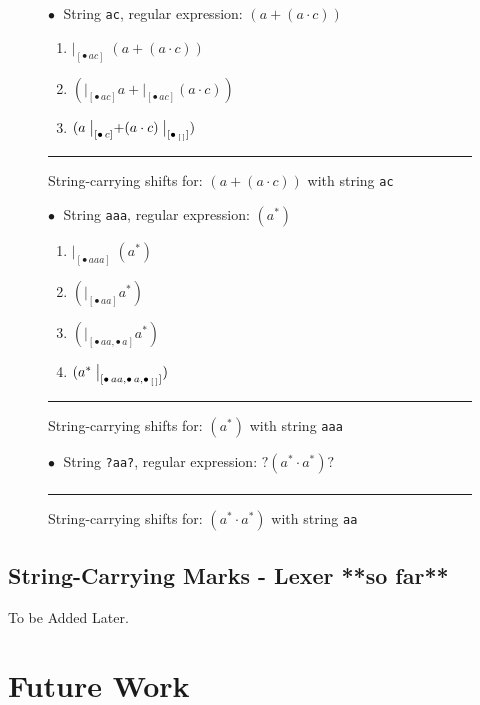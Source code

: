 \documentclass[12pt]{article}
\newcommand{\Marked}[1]{\bullet\,#1}
\newcommand{\emptylist}{[\,]}
\begin{document}
\begin{figure}[ht]
  $\bullet\;$ String \texttt{ac}, regular expression: $(a + (a \cdot c))$
\begin{enumerate}
  \item $\bigl|_{[\Marked{ac}]} \;( a + (a \cdot c) )$
  \item $(\bigl|_{[\Marked{ac}]} a + \bigl|_{[\Marked{ac}]} (a \cdot c))$
  \item $(a \;\bigl|_{[\Marked{c}]} + (a \cdot c)\;\bigl|_{[\Marked_{\emptylist}]})$
\end{enumerate}
  \mbox{}
  \hrule
  \caption{String-carrying shifts for: $(a + (a \cdot c))$ with string \texttt{ac}}
  \label{StringShiftsExample1}
\end{figure}


\begin{figure}[ht]
  $\bullet\;$ String \texttt{aaa}, regular expression: $(a^*)$
\begin{enumerate}
  \item $\bigl|_{[\Marked{aaa}]} \;(a^*)$
  \item $(\bigl|_{[\Marked{aa}]} a^*)$
  \item $( \bigl|_{[\Marked{aa}, \Marked{a}]} a^*)$
  \item $(a^* \;\bigl|_{[\Marked{aa}, \Marked{a}, \Marked_{\emptylist}]})$
\end{enumerate}

  \mbox{}
  \hrule
  \caption{String-carrying shifts for: $(a^*)$ with string \texttt{aaa}}
  \label{StringShiftsExample2}
\end{figure}


\begin{figure}[ht]
  $\bullet\;$ String \texttt{?aa?}, regular expression: $?(a^* \cdot a^*)?$
  \[
  \begin{array}{l}
   
  \end{array}
  \]
  \mbox{}
  \hrule
  \caption{String-carrying shifts for: $(a^* \cdot a^*)$ with string \texttt{aa}}
  \label{StringShiftsExample3}
\end{figure}

\FloatBarrier
\subsection{String-Carrying Marks - Lexer **so far**}
To be Added Later.
\section{Future Work}
\end{document}
